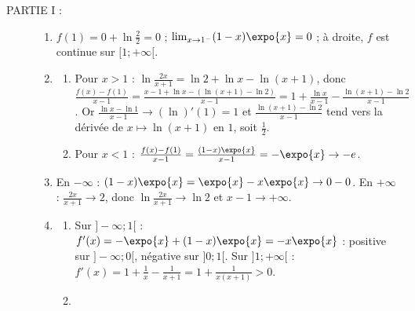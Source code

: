 \begin{description}
	\item[PARTIE I :]
	\begin{enumerate}
		\item {}
			$f(1) = 0 + \ln\frac{2}{2} = 0$ ; $\lim_{x\to 1^-} (1 - x)\expo{x} = 0$ ; à droite, $f$ est continue sur $[1;+\infty[$.
			\par\noindent{}
		\item
		\begin{enumerate}
			\item {}
				Pour $x > 1$ : $\ln\frac{2x}{x+1} = \ln 2 + \ln x - \ln(x+1)$, donc
				$\frac{f(x) - f(1)}{x - 1} = \frac{x - 1 + \ln x - \left(\ln(x+1) - \ln 2\right)}{x - 1} = 1 + \frac{\ln x}{x - 1} - \frac{\ln(x+1) - \ln 2}{x - 1}$.
				Or $\frac{\ln x - \ln 1}{x - 1} \to (\ln)'(1) = 1$ et $\frac{\ln(x+1) - \ln 2}{x - 1}$ tend vers la dérivée de $x \mapsto \ln(x+1)$ en $1$, soit $\frac{1}{2}$.
				\par\noindent{}
			\item {}
				Pour $x < 1$ : $\frac{f(x) - f(1)}{x - 1} = \frac{(1 - x)\expo{x}}{x - 1} = -\expo{x} \to -e$.
				\par\noindent{}
		\end{enumerate}
		\item {}
			En $-\infty$ : $(1 - x)\expo{x} = \expo{x} - x\expo{x} \to 0 - 0$. En $+\infty$ : $\frac{2x}{x+1} \to 2$, donc $\ln\frac{2x}{x+1} \to \ln 2$ et $x - 1 \to +\infty$.
			\par\noindent{}
		\item
		\begin{enumerate}
			\item {}
				Sur $]-\infty;1[$ : $f'(x) = -\expo{x} + (1 - x)\expo{x} = -x\expo{x}$ : positive sur $]-\infty;0[$, négative sur $]0;1[$.
				Sur $]1;+\infty[$ : $f'(x) = 1 + \frac{1}{x} - \frac{1}{x+1} = 1 + \frac{1}{x(x+1)} > 0$.
				\par\noindent\ansbox{$f$ est croissante sur $]-\infty;0]$, décroissante sur $[0;1]$, croissante sur $[1;+\infty[$.}
			\item {}

\end{enumerate}
\end{enumerate}
\end{description}
